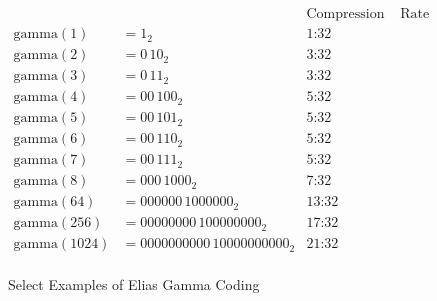 \begin{figure}
	
	\centering
	\begin{align*}
						&		&\text{Compression}&\text{ Rate}\\
		\mathrm{gamma}(1) &= 1_2  &\text{1:32} \\
		\mathrm{gamma}(2) &= 0\,10_2 &\text{3:32} \\
		\mathrm{gamma}(3) &= 0\,11_2 &\text{3:32} \\
		\mathrm{gamma}(4) &= 00\,100_2 &\text{5:32} \\
		\mathrm{gamma}(5) &= 00\,101_2 &\text{5:32} \\
		\mathrm{gamma}(6) &= 00\,110_2 &\text{5:32} \\
		\mathrm{gamma}(7) &= 00\,111_2 &\text{5:32} \\
		\mathrm{gamma}(8) &= 000\,1000_2 &\text{7:32}\\
		\mathrm{gamma}(64) &= 000000\,1000000_2 &\text{13:32}\\
		\mathrm{gamma}(256) &= 00000000\,100000000_2 &\text{17:32} \\
		\mathrm{gamma}(1024) &= 0000000000\,10000000000_2 &\text{21:32} \\
	\end{align*}
	
	\caption{Select Examples of Elias Gamma Coding}
	\label{fig:bg-comp-gamma-ex}
\end{figure}